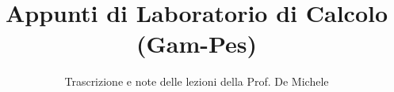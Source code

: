 \documentclass[a4paper,12pt]{article}
\title{Appunti di Laboratorio di Calcolo (Gam-Pes)}
\author{Trascrizione e note delle lezioni della Prof. De Michele}
\date{}
\begin{document}
\maketitle
\projectintro
\tableofcontents
\newpage

\end{document}
